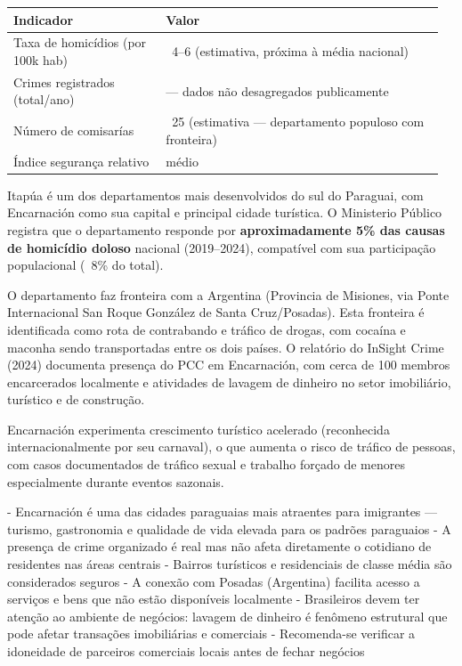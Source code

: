 {\small
\setlength{\tabcolsep}{3pt}
\renewcommand{\arraystretch}{1.12}
\begin{tabularx}{\linewidth}{>{\raggedright\arraybackslash}p{0.34\linewidth} >{\raggedright\arraybackslash}p{0.62\linewidth}}
\toprule
Indicador & Valor \\
\midrule
Taxa de homicídios (por 100k hab) & ~4--6 (estimativa, próxima à média nacional) \\
Crimes registrados (total/ano) & --- dados não desagregados publicamente \\
Número de comisarías & ~25 (estimativa --- departamento populoso com fronteira) \\
Índice segurança relativo & médio \\
\bottomrule
\end{tabularx}
}


Itapúa é um dos departamentos mais desenvolvidos do sul do Paraguai, com Encarnación como sua capital e principal cidade turística. O Ministerio Público registra que o departamento responde por \textbf{aproximadamente 5\% das causas de homicídio doloso} nacional (2019--2024), compatível com sua participação populacional (~8\% do total).

O departamento faz fronteira com a Argentina (Provincia de Misiones, via Ponte Internacional San Roque González de Santa Cruz/Posadas). Esta fronteira é identificada como rota de contrabando e tráfico de drogas, com cocaína e maconha sendo transportadas entre os dois países. O relatório do InSight Crime (2024) documenta presença do PCC em Encarnación, com cerca de 100 membros encarcerados localmente e atividades de lavagem de dinheiro no setor imobiliário, turístico e de construção.

Encarnación experimenta crescimento turístico acelerado (reconhecida internacionalmente por seu carnaval), o que aumenta o risco de tráfico de pessoas, com casos documentados de tráfico sexual e trabalho forçado de menores especialmente durante eventos sazonais.


- Encarnación é uma das cidades paraguaias mais atraentes para imigrantes --- turismo, gastronomia e qualidade de vida elevada para os padrões paraguaios
- A presença de crime organizado é real mas não afeta diretamente o cotidiano de residentes nas áreas centrais
- Bairros turísticos e residenciais de classe média são considerados seguros
- A conexão com Posadas (Argentina) facilita acesso a serviços e bens que não estão disponíveis localmente
- Brasileiros devem ter atenção ao ambiente de negócios: lavagem de dinheiro é fenômeno estrutural que pode afetar transações imobiliárias e comerciais
- Recomenda-se verificar a idoneidade de parceiros comerciais locais antes de fechar negócios




